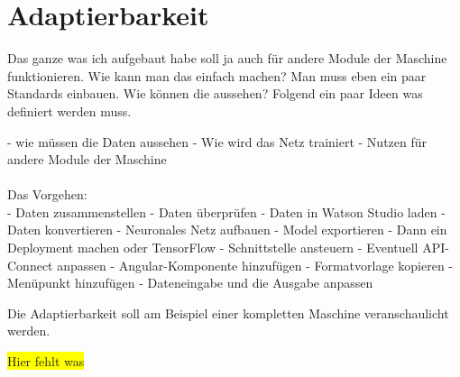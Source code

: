 \chapter{Adaptierbarkeit}
Das ganze was ich aufgebaut habe soll ja auch für andere Module der Maschine funktionieren. Wie kann man das einfach
machen? Man muss eben ein paar Standards einbauen. Wie können die aussehen? Folgend ein paar Ideen was definiert werden
muss.

- wie müssen die Daten aussehen
- Wie wird das Netz trainiert
- Nutzen für andere Module der Maschine\\ \\

Das Vorgehen: \\
- Daten zusammenstellen
- Daten überprüfen
- Daten in Watson Studio laden
- Daten konvertieren
- Neuronales Netz aufbauen
- Model exportieren
- Dann ein Deployment machen oder TensorFlow
- Schnittstelle ansteuern
- Eventuell API-Connect anpassen
- Angular-Komponente hinzufügen
- Formatvorlage kopieren
- Menüpunkt hinzufügen
- Dateneingabe und die Ausgabe anpassen


Die Adaptierbarkeit soll am Beispiel einer kompletten Maschine veranschaulicht werden.

\colorbox{yellow}{Hier fehlt was}